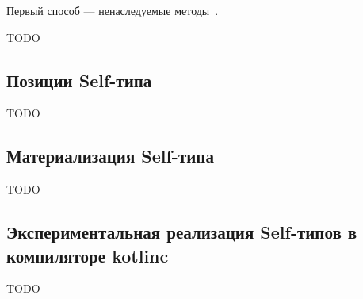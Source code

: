 Первый способ --- ненаследуемые методы~\cite{saito2009matching}.

TODO %


\subsection{Позиции Self-типа} \label{subsec:self-positions}

TODO %


\subsection{Материализация Self-типа}

TODO %


\subsection{Экспериментальная реализация Self-типов в компиляторе kotlinc}

TODO %
